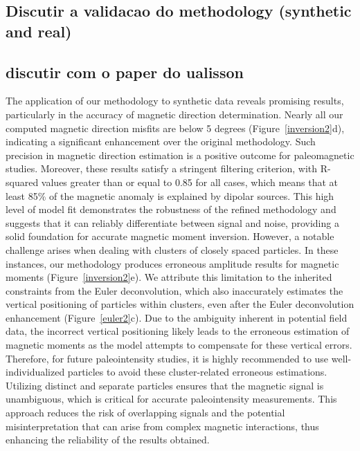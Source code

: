 \subsection{Discutir a validacao do methodology (synthetic and real)}




\subsection{discutir com o paper do ualisson}





The application of our methodology to synthetic data reveals promising results, particularly in the accuracy of magnetic direction determination. Nearly all our computed magnetic direction misfits are below 5 degrees (Figure~\ref{inversion2}d), indicating a significant enhancement over the original methodology. Such precision in magnetic direction estimation is a positive outcome for paleomagnetic studies. Moreover, these results satisfy a stringent filtering criterion, with R-squared values greater than or equal to 0.85 for all cases, which means that at least 85\% of the magnetic anomaly is explained by dipolar sources. This high level of model fit demonstrates the robustness of the refined methodology and suggests that it can reliably differentiate between signal and noise, providing a solid foundation for accurate magnetic moment inversion. However, a notable challenge arises when dealing with clusters of closely spaced particles. In these instances, our methodology produces erroneous amplitude results for magnetic moments (Figure~\ref{inversion2}e). We attribute this limitation to the inherited constraints from the Euler deconvolution, which also inaccurately estimates the vertical positioning of particles within clusters, even after the Euler deconvolution enhancement (Figure~\ref{euler2}c). Due to the ambiguity inherent in potential field data, the incorrect vertical positioning likely leads to the erroneous estimation of magnetic moments as the model attempts to compensate for these vertical errors. Therefore, for future paleointensity studies, it is highly recommended to use well-individualized particles to avoid these cluster-related erroneous estimations. Utilizing distinct and separate particles ensures that the magnetic signal is unambiguous, which is critical for accurate paleointensity measurements. This approach reduces the risk of overlapping signals and the potential misinterpretation that can arise from complex magnetic interactions, thus enhancing the reliability of the results obtained.

